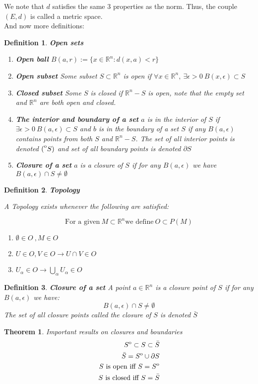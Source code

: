 \documentclass[titlepage]{article}
\newtheorem{theorem}{Theorem}[section]
\newtheorem{definition}{Definition}
\newcommand{\interior}[1]{%
  {\kern0pt#1}^{\mathrm{o}}%
}
\newcommand{\Rn}{\mathbb{R}^n}
\begin{document}
We note that $d$ satisfies the same 3 properties as the norm. Thus, the couple \textbf{$(E,d)$} is called a metric space. 
\\

And now more definitions:

\begin{definition} \textbf{Open sets}
\begin{enumerate}
    \\
    
    \item \textbf{Open ball} $ B(a,r) := \{x \in \Rn : d(x,a) < r\}$
    \item \textbf{Open subset} Some subset $S \subset \Rn$ is open if $\forall x \in \Rn, \ \exists \epsilon > 0 \ B(x,\epsilon) \subset S$
    \item \textbf{Closed subset} Some $S$ is closed if $\Rn - S$ is open, note that the empty set and $\Rn$ are both open and closed. 
    \item \textbf{The interior and boundary of a set} $a$ is in the interior of $S$ if $\exists \epsilon > 0 \ B(a,\epsilon) \subset S$ and $b$ is in the boundary of a set $S$ if any $B(a, \epsilon)$ contains points from both $S$ and $\Rn - S$. The set of all interior points is denoted $\interior(S)$ and set of all boundary points is denoted $\partial S$
    \item \textbf{Closure of a set} $a$ is a closure of $S$ if for any $B(a,\epsilon)$ we have $B(a, \epsilon) \cap S \not = \emptyset$ 
\end{enumerate}

\end{definition}

\begin{definition}\textbf{Topology}

A Topology exists whenever the following are satisfied:

$$\text{For a given} \ M \subset \Rn \text{we define} \ O \subset P(M) $$
\begin{enumerate}
    \item $\emptyset \in O \ , M \in O $
    \item $U \in O, V \in O \rightarrow U \cap V \in O$
    \item $U_{\alpha} \in O \rightarrow \bigcup_{\alpha} U_{\alpha} \in O$
\end{enumerate}

\end{definition}


\begin{definition}\textbf{Closure of a set}
A point $a \in \Rn$ is a closure point of $S$ if for any $B(a,\epsilon)$ we have:
$$B(a,\epsilon) \cap S \not = \emptyset$$
The set of all closure points called the closure of $S$ is denoted $\bar{S}$
\end{definition}

\begin{theorem}
Important results on closures and boundaries
\begin{align*}
    \interior{S} \subset S \subset \bar{S}\\
    \bar{S} = \interior{S} \cup \partial S\\
    S \ \text{is open iff} \ S = \interior{S}\\
    S \ \text{is closed iff} \ S = \bar{S}\\
\end{align*}
    
\end{theorem}
\end{document}
